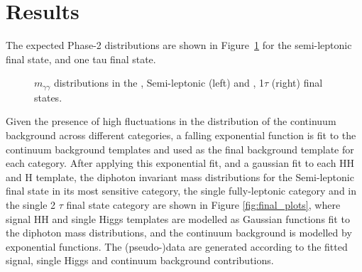 \section{Results} \label{sec:Phase_II_results}

The expected Phase-2 \mgg distributions are shown in Figure~\ref{fig:prefit} for the semi-leptonic \wwgg final state, and one tau \ttgg final state. 

\begin{figure}[!htbp]
    \setcounter{subfigure}{0}
    \centering
    \qquad
    \caption{$m_{\gamma\gamma}$ distributions in the \wwgg, Semi-leptonic (left) and \ttgg, 1$\tau$ (right) final states.}
    \label{fig:prefit}
\end{figure}

Given the presence of high fluctuations in the \mgg distribution of the continuum background across different categories, a falling exponential function is fit to the continuum background templates and used as the final background template for each category. After applying this exponential fit, and a gaussian fit to each HH and H template, the diphoton invariant mass distributions for the Semi-leptonic final state in its most sensitive category, the single fully-leptonic category and in the single 2 $\tau$ final state category are shown in Figure \ref{fig:final_plots}, where signal HH and single Higgs templates are modelled as Gaussian functions fit to the diphoton mass distributions, and the continuum background is modelled by exponential functions. The (pseudo-)data are generated according to the fitted signal, single Higgs and continuum background contributions.  

